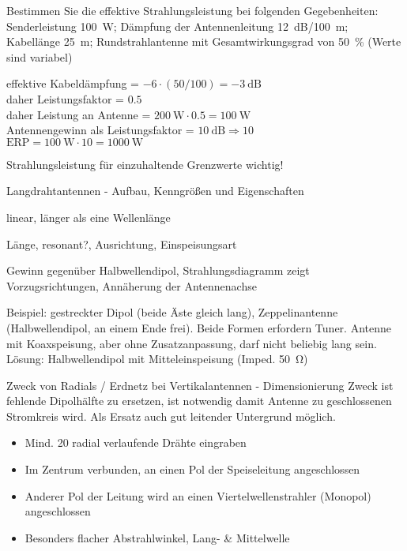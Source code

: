 \documentclass[avery5371,grid,frame,a4paper]{flashcards}
\newcommand{\card}[3]{
  \begin{flashcard}[{\chap} -- #1]{#2}#3\end{flashcard}
}
\begin{document}
\card{80}{Bestimmen Sie die effektive Strahlungsleistung bei folgenden Gegebenheiten: Senderleistung \SI{100}{\watt}; Dämpfung der Antennenleitung \SI{12}{\dB}/\SI{100}{\metre}; Kabellänge \SI{25}{\metre}; Rundstrahlantenne mit Gesamtwirkungsgrad von \SI{50}{\percent} (Werte sind variabel)}{
  \item
  effektive Kabeldämpfung = $-6\cdot (50/100) = \SI{-3}{\dB}$ \\
  daher Leistungsfaktor = $0.5$ \\
  daher Leistung an Antenne = $\SI{200}{\watt} \cdot 0.5 = \SI{100}\watt$ \\
  Antennengewinn als Leistungsfaktor = $\SI{10}{\dB} \Rightarrow 10$ \\
  $\text{ERP} = \SI{100}{\watt} \cdot 10 = \SI{1000}{\watt}$

  \item
  Strahlungsleistung für einzuhaltende Grenzwerte wichtig!
}
\card{81}{Langdrahtantennen - Aufbau, Kenngrößen und Eigenschaften}{
  \small
  \begin{description}\itemsep0pt
    \item[Aufbau]
      linear, länger als eine Wellenlänge
    \item[Kenngröße]
      {\footnotesize Länge, resonant?, Ausrichtung, Einspeisungsart}
    \item[Eigenschaften]
      Gewinn gegenüber Halbwellendipol,
      Strahlungsdiagramm zeigt Vorzugsrichtungen,
      Annäherung der Antennenachse
  \end{description}

  Beispiel: gestreckter Dipol (beide Äste gleich lang), Zeppelinantenne (Halbwellendipol, an einem Ende frei).
  Beide Formen erfordern Tuner.
  Antenne mit Koaxspeisung, aber ohne Zusatzanpassung, darf nicht beliebig lang sein.
  Lösung: Halbwellendipol mit Mitteleinspeisung (Imped. \SI{50}{\ohm})
}
\card{82}{Zweck von Radials / Erdnetz bei Vertikalantennen - Dimensionierung}{
  \small
  Zweck ist fehlende Dipolhälfte zu ersetzen, ist notwendig damit Antenne zu geschlossenen Stromkreis wird. Als Ersatz auch gut leitender Untergrund möglich.

  \begin{itemize}
    \item Mind. 20 radial verlaufende Drähte eingraben
    \item Im Zentrum verbunden, an einen Pol der Speiseleitung angeschlossen
    \item Anderer Pol der Leitung wird an einen Viertelwellenstrahler (Monopol) angeschlossen
    \item Besonders flacher Abstrahlwinkel, Lang- \& Mittelwelle
  \end{itemize}
}
\end{document}
